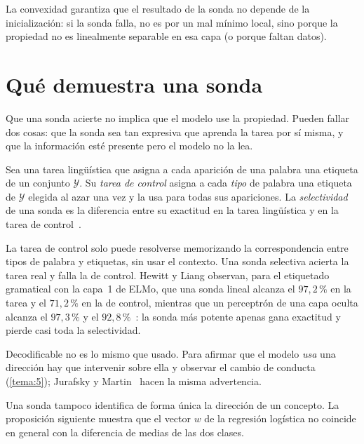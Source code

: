 La convexidad garantiza que el resultado de la sonda no depende de la inicialización: si la sonda falla, no es por un mal mínimo local, sino porque la propiedad no es linealmente separable en esa capa (o porque faltan datos).

\addtocounter{definicion}{1}%

\section{Qué demuestra una sonda}
\label{sec:2-control}

Que una sonda acierte no implica que el modelo use la propiedad. Pueden fallar dos cosas: que la sonda sea tan expresiva que aprenda la tarea por sí misma, y que la información esté presente pero el modelo no la lea.

\begin{definicion}\label{def:control}
Sea una tarea lingüística que asigna a cada aparición de una palabra una etiqueta de un conjunto $\mathcal{Y}$. Su \emph{tarea de control} asigna a cada \emph{tipo} de palabra una etiqueta de $\mathcal{Y}$ elegida al azar una vez y la usa para todas sus apariciones. La \emph{selectividad} de una sonda es la diferencia entre su exactitud en la tarea lingüística y en la tarea de control~\cite[§2]{hewitt-liang}.
\end{definicion}

La tarea de control solo puede resolverse memorizando la correspondencia entre tipos de palabra y etiquetas, sin usar el contexto. Una sonda selectiva acierta la tarea real y falla la de control. Hewitt y Liang observan, para el etiquetado gramatical con la capa~1 de ELMo, que una sonda lineal alcanza el $97{,}2\,\%$ en la tarea y el $71{,}2\,\%$ en la de control, mientras que un perceptrón de una capa oculta alcanza el $97{,}3\,\%$ y el $92{,}8\,\%$~\cite[§3.5]{hewitt-liang}: la sonda más potente apenas gana exactitud y pierde casi toda la selectividad.

\begin{observacion}\label{obs:usado}
Decodificable no es lo mismo que usado. Para afirmar que el modelo \emph{usa} una dirección hay que intervenir sobre ella y observar el cambio de conducta (\cref{tema:5}); Jurafsky y Martin~\cite[§10.2]{jm3} hacen la misma advertencia.
\end{observacion}

Una sonda tampoco identifica de forma única la dirección de un concepto. La proposición siguiente muestra que el vector $w$ de la regresión logística no coincide en general con la diferencia de medias de las dos clases.


